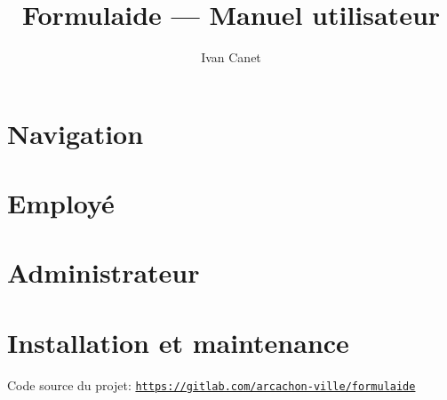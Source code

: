 \documentclass[11pt,french]{memoir}
\newcommand{\hrefs}[1]{\href{#1}{\texttt{#1}}}
\begin{document}
	\renewcommand{\chaptername}{Partie}

	\frontmatter
	\title{Formulaide --- Manuel utilisateur}
	\author{Ivan Canet}
	\maketitle

	\tableofcontents

	\mainmatter


	\chapter{Navigation}\label{ch:navbar}


	\chapter{Employé}\label{ch:employee}


	\chapter{Administrateur}\label{ch:admin}


	\chapter{Installation et maintenance}\label{ch:maintenance}

	\appendix
	\renewcommand{\bibname}{Références}
	\begin{thebibliography}{9}

		Code source du projet:
		\hrefs{https://gitlab.com/arcachon-ville/formulaide}

	\end{thebibliography}
\end{document}
